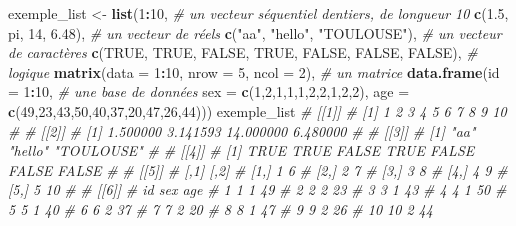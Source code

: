 \documentclass[
]{book}
\newenvironment{Shaded}{\begin{snugshade}}{\end{snugshade}}
\newcommand{\AttributeTok}[1]{\textcolor[rgb]{0.13,0.29,0.53}{#1}}
\newcommand{\CommentTok}[1]{\textcolor[rgb]{0.56,0.35,0.01}{\textit{#1}}}
\newcommand{\ConstantTok}[1]{\textcolor[rgb]{0.56,0.35,0.01}{#1}}
\newcommand{\DecValTok}[1]{\textcolor[rgb]{0.00,0.00,0.81}{#1}}
\newcommand{\FloatTok}[1]{\textcolor[rgb]{0.00,0.00,0.81}{#1}}
\newcommand{\FunctionTok}[1]{\textcolor[rgb]{0.13,0.29,0.53}{\textbf{#1}}}
\newcommand{\NormalTok}[1]{#1}
\newcommand{\OtherTok}[1]{\textcolor[rgb]{0.56,0.35,0.01}{#1}}
\newcommand{\SpecialCharTok}[1]{\textcolor[rgb]{0.81,0.36,0.00}{\textbf{#1}}}
\newcommand{\StringTok}[1]{\textcolor[rgb]{0.31,0.60,0.02}{#1}}
\begin{document}
\begin{Shaded}
\begin{Highlighting}[]
\NormalTok{exemple\_list }\OtherTok{\textless{}{-}} \FunctionTok{list}\NormalTok{(}\DecValTok{1}\SpecialCharTok{:}\DecValTok{10}\NormalTok{, }\CommentTok{\# un vecteur séquentiel d\textquotesingle{}entiers, de longueur 10}
                     \FunctionTok{c}\NormalTok{(}\FloatTok{1.5}\NormalTok{, pi, }\DecValTok{14}\NormalTok{, }\FloatTok{6.48}\NormalTok{), }\CommentTok{\# un vecteur de réels}
                     \FunctionTok{c}\NormalTok{(}\StringTok{"aa"}\NormalTok{, }\StringTok{"hello"}\NormalTok{, }\StringTok{"TOULOUSE"}\NormalTok{), }\CommentTok{\# un vecteur de caractères}
                     \FunctionTok{c}\NormalTok{(}\ConstantTok{TRUE}\NormalTok{, }\ConstantTok{TRUE}\NormalTok{, }\ConstantTok{FALSE}\NormalTok{, }\ConstantTok{TRUE}\NormalTok{, }\ConstantTok{FALSE}\NormalTok{, }\ConstantTok{FALSE}\NormalTok{, }\ConstantTok{FALSE}\NormalTok{), }\CommentTok{\# logique}
                     \FunctionTok{matrix}\NormalTok{(}\AttributeTok{data =} \DecValTok{1}\SpecialCharTok{:}\DecValTok{10}\NormalTok{, }\AttributeTok{nrow =} \DecValTok{5}\NormalTok{, }\AttributeTok{ncol =} \DecValTok{2}\NormalTok{), }\CommentTok{\# un matrice}
                     \FunctionTok{data.frame}\NormalTok{(}\AttributeTok{id =} \DecValTok{1}\SpecialCharTok{:}\DecValTok{10}\NormalTok{,                }\CommentTok{\# une base de données}
                                \AttributeTok{sex =} \FunctionTok{c}\NormalTok{(}\DecValTok{1}\NormalTok{,}\DecValTok{2}\NormalTok{,}\DecValTok{1}\NormalTok{,}\DecValTok{1}\NormalTok{,}\DecValTok{1}\NormalTok{,}\DecValTok{2}\NormalTok{,}\DecValTok{2}\NormalTok{,}\DecValTok{1}\NormalTok{,}\DecValTok{2}\NormalTok{,}\DecValTok{2}\NormalTok{),}
                                \AttributeTok{age =} \FunctionTok{c}\NormalTok{(}\DecValTok{49}\NormalTok{,}\DecValTok{23}\NormalTok{,}\DecValTok{43}\NormalTok{,}\DecValTok{50}\NormalTok{,}\DecValTok{40}\NormalTok{,}\DecValTok{37}\NormalTok{,}\DecValTok{20}\NormalTok{,}\DecValTok{47}\NormalTok{,}\DecValTok{26}\NormalTok{,}\DecValTok{44}\NormalTok{)))}
\NormalTok{exemple\_list}
\CommentTok{\# [[1]]}
\CommentTok{\#  [1]  1  2  3  4  5  6  7  8  9 10}
\CommentTok{\# }
\CommentTok{\# [[2]]}
\CommentTok{\# [1]  1.500000  3.141593 14.000000  6.480000}
\CommentTok{\# }
\CommentTok{\# [[3]]}
\CommentTok{\# [1] "aa"       "hello"    "TOULOUSE"}
\CommentTok{\# }
\CommentTok{\# [[4]]}
\CommentTok{\# [1]  TRUE  TRUE FALSE  TRUE FALSE FALSE FALSE}
\CommentTok{\# }
\CommentTok{\# [[5]]}
\CommentTok{\#      [,1] [,2]}
\CommentTok{\# [1,]    1    6}
\CommentTok{\# [2,]    2    7}
\CommentTok{\# [3,]    3    8}
\CommentTok{\# [4,]    4    9}
\CommentTok{\# [5,]    5   10}
\CommentTok{\# }
\CommentTok{\# [[6]]}
\CommentTok{\#    id sex age}
\CommentTok{\# 1   1   1  49}
\CommentTok{\# 2   2   2  23}
\CommentTok{\# 3   3   1  43}
\CommentTok{\# 4   4   1  50}
\CommentTok{\# 5   5   1  40}
\CommentTok{\# 6   6   2  37}
\CommentTok{\# 7   7   2  20}
\CommentTok{\# 8   8   1  47}
\CommentTok{\# 9   9   2  26}
\CommentTok{\# 10 10   2  44}
\end{Highlighting}
\end{Shaded}
\end{document}

